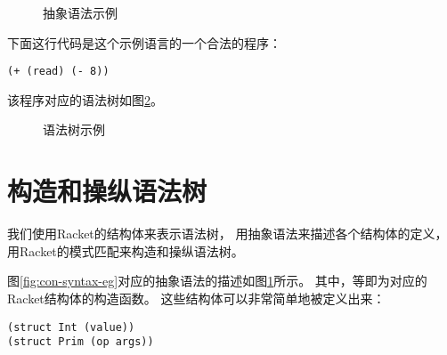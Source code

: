 \begin{figure}[t]
  \caption{抽象语法示例}
  \label{fig:abs-syntax-eg}
\end{figure}


下面这行代码是这个示例语言的一个合法的程序：

\begin{onelinecode}
\begin{lstlisting}
(+ (read) (- 8))
\end{lstlisting}
\end{onelinecode}

该程序对应的语法树如图\ref{fig:ast-eg}。

\begin{figure}[t]
  \begin{center}
  \end{center}
  \caption{语法树示例}
  \label{fig:ast-eg}
\end{figure}

\section{构造和操纵语法树}

我们使用Racket的结构体来表示语法树，
用抽象语法来描述各个结构体的定义，
用Racket的模式匹配来构造和操纵语法树。

图\ref{fig:con-syntax-eg}对应的抽象语法的描述如图\ref{fig:abs-syntax-eg}所示。
其中，等即为对应的Racket结构体的构造函数。
这些结构体可以非常简单地被定义出来：
\begin{multilinecode}
\begin{lstlisting}
(struct Int (value))
(struct Prim (op args))
\end{lstlisting}
\end{multilinecode}

